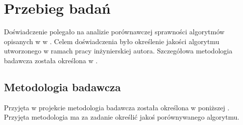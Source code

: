 \chapter{Przebieg badań}
Doświadczenie polegało na analizie porównawczej sprawności algorytmów opisanych w  w . Celem doświadczenia było określenie jakości algorytmu utworzonego w ramach pracy inżynierskiej autora\cite{Blyszcz2022}. Szczegółowa metodologia badawcza została określona w .

\section{Metodologia badawcza}
\label{sec:met}
Przyjęta w projekcie metodologia badawcza została określona w poniższej . Przyjęta metodologia ma za zadanie określić jakoś porównywanego algorytmu.

